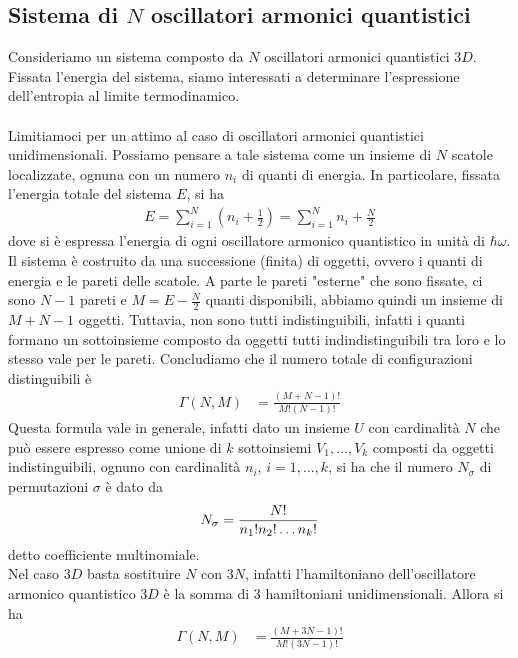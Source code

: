 \documentclass{article}
\begin{document}
\newpage
\subsection{Sistema di $N$ oscillatori armonici quantistici} 
Consideriamo un sistema composto da $N$ oscillatori armonici quantistici $3D$. Fissata l'energia del sistema, siamo interessati a determinare l'espressione dell'entropia al limite termodinamico. \\ \\
Limitiamoci per un attimo al caso di oscillatori armonici quantistici unidimensionali. Possiamo pensare a tale sistema come un insieme di $N$ scatole localizzate, ognuna con un numero $n_i$ di quanti di energia. In particolare, fissata l'energia totale del sistema $E$, si ha 
\begin{align}
    E = \sum_{i = 1}^N(n_i + \frac{1}{2}) = \sum_{i = 1}^N n_i + \frac{N}{2} \tag{1.8.1}
\end{align}
dove si è espressa l'energia di ogni oscillatore armonico quantistico in unità di $\hbar\omega$. Il sistema è costruito da una successione (finita) di oggetti, ovvero i quanti di energia e le pareti delle scatole. A parte le pareti "esterne" che sono fissate, ci sono $N - 1$ pareti e $M = E - \frac{N}{2}$ quanti disponibili, abbiamo quindi un insieme di $M + N - 1$ oggetti. Tuttavia, non sono tutti indistinguibili, infatti i quanti formano un sottoinsieme composto da oggetti tutti indindistinguibili tra loro e lo stesso vale per le pareti. Concludiamo che il numero totale di configurazioni distinguibili è 
\begin{align}
    \Gamma(N, M) &= \frac{(M + N - 1)!}{M!(N - 1)!} \tag{1.8.2}
\end{align}
Questa formula vale in generale, infatti dato un insieme $U$ con cardinalità $N$ che può essere espresso come unione di $k$ sottoinsiemi $V_1, \dots, V_k$ composti da oggetti indistinguibili, ognuno con cardinalità $n_i$, $i = 1, \dots, k$, si ha che il numero $N_\sigma$ di permutazioni $\sigma$ è dato da
\begin{align}
    N_\sigma = \frac{N!}{n_1!n_2!\dots n_k!} \notag
\end{align}
detto coefficiente multinomiale. \\
Nel caso $3D$ basta sostituire $N$ con $3N$, infatti l'hamiltoniano dell'oscillatore armonico quantistico $3D$ è la somma di 3 hamiltoniani unidimensionali. Allora si ha 
\begin{align}
    \Gamma(N, M) &= \frac{(M + 3N - 1)!}{M!(3N - 1)!} \tag{1.8.3}
\end{align}
\end{document}
